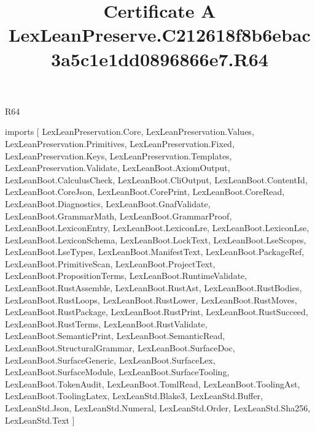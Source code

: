 \begin{lexlean}{R64}
\title{Certificate A LexLeanPreserve.C212618f8b6ebac3a5c1e1dd0896866e7.R64}
\begin{coremodule}
imports [
  LexLeanPreservation.Core,
  LexLeanPreservation.Values,
  LexLeanPreservation.Primitives,
  LexLeanPreservation.Fixed,
  LexLeanPreservation.Keys,
  LexLeanPreservation.Templates,
  LexLeanPreservation.Validate,
  LexLeanBoot.AxiomOutput,
  LexLeanBoot.CalculusCheck,
  LexLeanBoot.CliOutput,
  LexLeanBoot.ContentId,
  LexLeanBoot.CoreJson,
  LexLeanBoot.CorePrint,
  LexLeanBoot.CoreRead,
  LexLeanBoot.Diagnostics,
  LexLeanBoot.GnafValidate,
  LexLeanBoot.GrammarMath,
  LexLeanBoot.GrammarProof,
  LexLeanBoot.LexiconEntry,
  LexLeanBoot.LexiconLre,
  LexLeanBoot.LexiconLse,
  LexLeanBoot.LexiconSchema,
  LexLeanBoot.LockText,
  LexLeanBoot.LseScopes,
  LexLeanBoot.LseTypes,
  LexLeanBoot.ManifestText,
  LexLeanBoot.PackageRef,
  LexLeanBoot.PrimitiveScan,
  LexLeanBoot.ProjectText,
  LexLeanBoot.PropositionTerms,
  LexLeanBoot.RuntimeValidate,
  LexLeanBoot.RustAssemble,
  LexLeanBoot.RustAst,
  LexLeanBoot.RustBodies,
  LexLeanBoot.RustLoops,
  LexLeanBoot.RustLower,
  LexLeanBoot.RustMoves,
  LexLeanBoot.RustPackage,
  LexLeanBoot.RustPrint,
  LexLeanBoot.RustSucceed,
  LexLeanBoot.RustTerms,
  LexLeanBoot.RustValidate,
  LexLeanBoot.SemanticPrint,
  LexLeanBoot.SemanticRead,
  LexLeanBoot.StructuralGrammar,
  LexLeanBoot.SurfaceDoc,
  LexLeanBoot.SurfaceGeneric,
  LexLeanBoot.SurfaceLex,
  LexLeanBoot.SurfaceModule,
  LexLeanBoot.SurfaceTooling,
  LexLeanBoot.TokenAudit,
  LexLeanBoot.TomlRead,
  LexLeanBoot.ToolingAst,
  LexLeanBoot.ToolingLatex,
  LexLeanStd.Blake3,
  LexLeanStd.Buffer,
  LexLeanStd.Json,
  LexLeanStd.Numeral,
  LexLeanStd.Order,
  LexLeanStd.Sha256,
  LexLeanStd.Text
]


\end{coremodule}
\end{lexlean}
